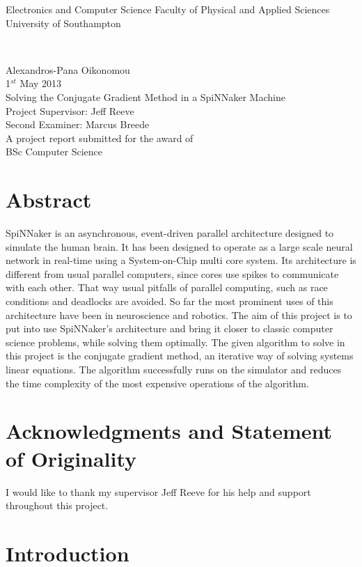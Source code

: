 \documentclass[12pt,a4paper]{article}
\author{Alexandros-Panagiotis Oikonomou}
\begin{document}
\begin{titlepage}
\begin{center}
\begin{LARGE}
Electronics and Computer Science
Faculty of Physical and Applied Sciences
University of Southampton 
\end{LARGE}
\\[2cm]
\begin{large}
Alexandros-Pana Oikonomou
\\
1$^{st}$ May 2013
\\[2cm]
Solving the Conjugate Gradient Method in a SpiNNaker Machine
\\[3.5cm]
Project Supervisor: Jeff Reeve
\\Second Examiner: Marcus Breede
\\[3.5cm]
A project report submitted for the award of
\\BSc Computer Science
\end{large}
\end{center}
\end{titlepage}
\section*{Abstract}
SpiNNaker is an asynchronous, event-driven parallel architecture designed to simulate
the human brain. It has been designed to operate as a large scale neural network in
real-time using a System-on-Chip multi core system. Its architecture is different from
usual parallel computers, since cores use spikes to communicate with each other. That
way usual pitfalls of parallel computing, such as race conditions and deadlocks are
avoided. So far the most prominent uses of this architecture have been in
neuroscience and robotics. The aim of this project is to put into use SpiNNaker's
architecture and bring it closer to classic computer science problems, while solving
them optimally. The given algorithm to solve in this project is the conjugate gradient
method, an iterative way of solving systems linear equations. The algorithm successfully runs on the simulator and reduces the time complexity of the most expensive operations of the algorithm.
\newpage
\tableofcontents
\newpage
\section*{Acknowledgments and Statement of Originality}
I would like to thank my supervisor Jeff Reeve for his help and support throughout this project.
\newpage
\section{Introduction}
\end{document}
